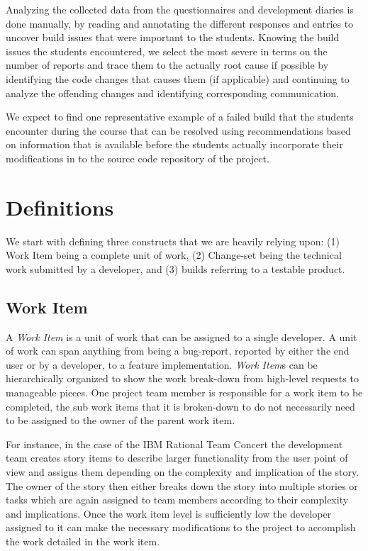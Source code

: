 Analyzing the collected data from the questionnaires and development diaries is done manually, by reading and annotating the different responses and entries to uncover build issues that were important to the students.
Knowing the build issues the students encountered, we select the most severe in terms on the number of reports and trace them to the actually root cause if possible by identifying the code changes that causes them (if applicable) and continuing to analyze the offending changes and identifying corresponding communication.

We expect to find one representative example of a failed build that the students encounter during the course that can be resolved using recommendations based on information that is available before the students actually incorporate their modifications in to the source code repository of the project.

\section{Definitions}
\label{c5:sec:definitions}
We start with defining three constructs that we are heavily relying upon: (1) Work Item being a complete unit of work, (2) Change-set being the technical work submitted by a developer, and (3) builds referring to a testable product.

\subsection{Work Item}
A \emph{Work Item} is a unit of work that can be assigned to a single developer.
A unit of work can span anything from being a bug-report, reported by either the end user or by a developer, to a feature implementation.
\emph{Work Item}s can be hierarchically organized to show the work break-down from high-level requests to manageable pieces.
One project team member is responsible for a work item to be completed, the sub work items that it is broken-down to do not necessarily need to be assigned to the owner of the parent work item.

For instance, in the case of the IBM Rational Team Concert the development team creates story items to describe larger functionality from the user point of view and assigns them depending on the complexity and implication of the story.
The owner of the story then either breaks down the story into multiple stories or tasks which are again assigned to team members according to their complexity and implications.
Once the work item level is sufficiently low the developer assigned to it can make the necessary modifications to the project to accomplish the work detailed in the work item.

